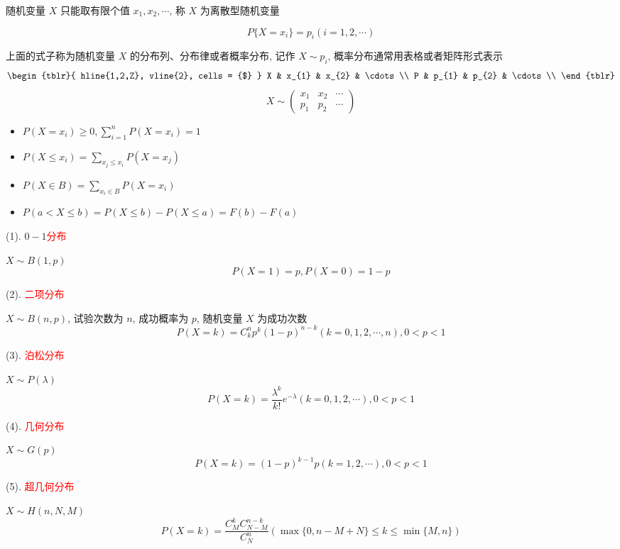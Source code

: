 \begin{definition}[一维离散型随机变量]
	随机变量 $X$ 只能取有限个值 $x_{1},x_{2},\cdots$, 称 $X$ 为离散型随机变量 
	
	$$P\{X = x_{i}\} = p_{i} (i = 1, 2, \cdots)$$
	
	上面的式子称为随机变量 $X$ 的分布列、分布律或者概率分布, 记作 $X\sim p_{i}$, 概率分布通常用表格或者矩阵形式表示
	$$\begin{tblr}{
		hline{1,2,Z},
		vline{2},
		cells = {$}
	}
		X & x_{1} & x_{2} & \cdots\\
		P & p_{1} & p_{2} & \cdots\\
	\end{tblr}$$
	$$ X\sim
	\begin{pmatrix}
	x_{1} & x_{2} & \cdots\\
	p_{1} & p_{2} & \cdots
	\end{pmatrix}$$
\end{definition}
\begin{corollary}[离散型随机变量的性质]
	\begin{itemize}
		\item $P(X = x_{i})\geq 0, \sum\limits_{i = 1}^{n}P(X = x_{i}) = 1$
		\item $P(X\leq x_{i}) = \sum\limits_{x_{j}\leq x_{i}}P(X = x_{j})$
		\item $P(X\in B) = \sum\limits_{x_{i}\in B}P(X = x_{i})$
		\item $P(a<X\leq b) = P(X\leq b) - P(X\leq a) = F(b) - F(a)$
	\end{itemize}
\end{corollary}

\begin{definition}[常见离散型随机变量分布]
	(1). $0-1$\textcolor{red}{分布}
	
	$X\sim B(1,p)$
	$$P(X = 1) = p,P(X = 0) = 1-p$$
	
	(2). \textcolor{red}{二项分布}
	
	$X\sim B(n,p)$, 试验次数为 $n$, 成功概率为 $p$, 随机变量 $X$ 为成功次数
	$$P(X=k) = C_{k}^{n}p^k(1-p)^{n-k}(k = 0, 1, 2, \cdots, n), 0 < p < 1$$
	
	(3). \textcolor{red}{泊松分布}

	$X\sim P(\lambda)$
	$$P(X = k) = \dfrac{\lambda^{k}}{k!}e^{-\lambda}(k = 0, 1, 2, \cdots), 0 < p < 1$$
	
	(4). \textcolor{red}{几何分布}
	
	$X\sim G(p)$
	$$P(X = k) = (1-p)^{k-1}p(k = 1, 2, \cdots), 0 < p < 1$$
	
	(5). \textcolor{red}{超几何分布}
	
	$X\sim H(n,N,M)$
	$$P(X = k) = \dfrac{C_{M}^{k}C_{N-M}^{n-k}}{C_{N}^{n}} (\max\{0,n-M+N\}\leq k\leq \min\{M,n\})$$
\end{definition}

